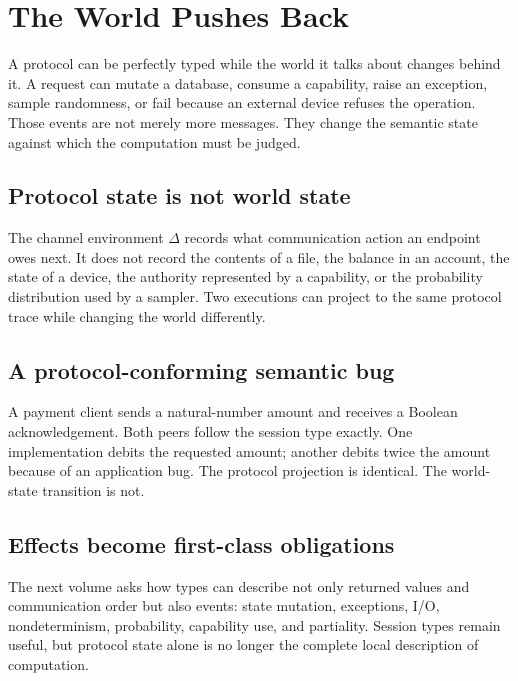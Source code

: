 \chapter{The World Pushes Back}

A protocol can be perfectly typed while the world it talks about changes behind it. A request can mutate a database, consume a capability, raise an exception, sample randomness, or fail because an external device refuses the operation. Those events are not merely more messages. They change the semantic state against which the computation must be judged.

\section{Protocol state is not world state}
The channel environment $\Delta$ records what communication action an endpoint owes next. It does not record the contents of a file, the balance in an account, the state of a device, the authority represented by a capability, or the probability distribution used by a sampler. Two executions can project to the same protocol trace while changing the world differently.



\section{A protocol-conforming semantic bug}
\begin{workedexample}
A payment client sends a natural-number amount and receives a Boolean acknowledgement. Both peers follow the session type exactly. One implementation debits the requested amount; another debits twice the amount because of an application bug. The protocol projection is identical. The world-state transition is not.
\end{workedexample}

\section{Effects become first-class obligations}
The next volume asks how types can describe not only returned values and communication order but also events: state mutation, exceptions, I/O, nondeterminism, probability, capability use, and partiality. Session types remain useful, but protocol state alone is no longer the complete local description of computation.



